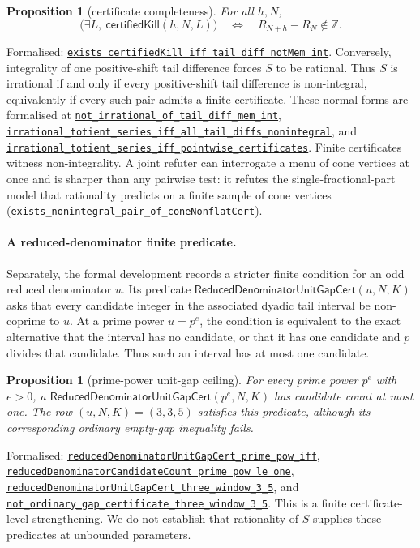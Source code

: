 \documentclass[11pt]{article}
\newcommand{\commit}{81150c1c6fdd4cd51e76d3aa0de344341e0e9e7c}
\newcommand{\repobase}{https://github.com/wcook04/plectis-lean-erdos249-257/blob/\commit}
\newcommand{\PK}{Erdos249257}
\newcommand{\lref}[3]{\href{\repobase/\PK/#1\#L#2}{\nolinkurl{#3}}}
\newcommand{\lrefx}[3]{\href{\repobase/\PK/#1\#L#2}{\nolinkurl{#3}}}
\newtheorem{proposition}[theorem]{Proposition}
\theoremstyle{definition}
\theoremstyle{remark}
\newcommand{\Z}{\mathbb{Z}}
\begin{document}
\begin{proposition}[certificate completeness]\label{res:complete}
For all $h,N$,
\[
\big(\exists L,\ \textsf{certifiedKill}(h,N,L)\big)
\quad\Longleftrightarrow\quad
R_{N+h}-R_N\notin\Z.
\]
\end{proposition}
\noindent Formalised: \lref{LcmConeFlatness.lean}{316}{exists_certifiedKill_iff_tail_diff_notMem_int}.
Conversely, integrality of one positive-shift tail difference forces $S$ to be
rational.  Thus $S$ is irrational if and only if every positive-shift tail
difference is non-integral, equivalently if every such pair admits a finite
certificate.  These normal forms are formalised at
\lrefx{LcmConeFlatness.lean}{357}{not_irrational_of_tail_diff_mem_int},
\lrefx{LcmConeFlatness.lean}{386}{irrational_totient_series_iff_all_tail_diffs_nonintegral},
and \lrefx{LcmConeFlatness.lean}{399}{irrational_totient_series_iff_pointwise_certificates}.
Finite certificates witness non-integrality. A joint refuter
can interrogate a menu of cone vertices at once and is sharper than any pairwise
test: it refutes the single-fractional-part model that rationality predicts on a
finite sample of cone vertices
(\lref{LcmConeNonflat.lean}{126}{exists_nonintegral_pair_of_coneNonflatCert}).

\paragraph{A reduced-denominator finite predicate.}  Separately, the formal
development records a stricter finite condition for an odd reduced denominator
$u$.  Its predicate $\textsf{ReducedDenominatorUnitGapCert}(u,N,K)$ asks that
every candidate integer in the associated dyadic tail interval be non-coprime
to $u$.  At a prime power $u=p^e$, the condition is equivalent to the exact
alternative that the interval has no candidate, or that it has one candidate
and $p$ divides that candidate.  Thus such an interval has at most one
candidate.

\begin{proposition}[prime-power unit-gap ceiling]\label{res:unitgap}
For every prime power $p^e$ with $e>0$, a
$\textsf{ReducedDenominatorUnitGapCert}(p^e,N,K)$ has candidate count at most
one.  The row $(u,N,K)=(3,3,5)$ satisfies this predicate, although its
corresponding ordinary empty-gap inequality fails.
\end{proposition}
\noindent Formalised:
\lref{PrimitiveWeightCertificate.lean}{54}{reducedDenominatorUnitGapCert_prime_pow_iff},
\lrefx{PrimitiveWeightCertificate.lean}{111}{reducedDenominatorCandidateCount_prime_pow_le_one},
\lrefx{PrimitiveWeightCertificate.lean}{151}{reducedDenominatorUnitGapCert_three_window_3_5}, and
\lrefx{PrimitiveWeightCertificate.lean}{157}{not_ordinary_gap_certificate_three_window_3_5}.
This is a finite certificate-level strengthening.  We do not establish that
rationality of $S$ supplies these predicates at unbounded parameters.
\end{document}

